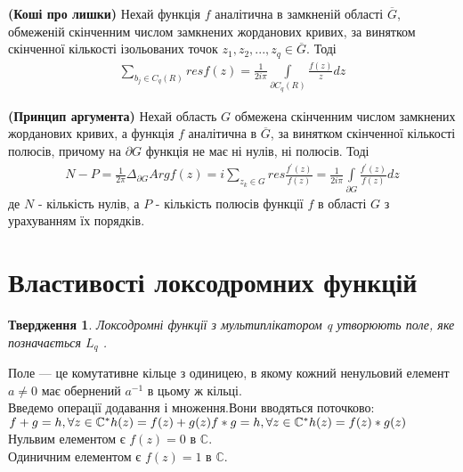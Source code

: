 \documentclass[12pt,a4paper]{article}
\begin{document}
\begin{thmNoNum}
\textbf{(Коші про лишки)}\label{thKoshi}
 Нехай функція $f$ аналітична в замкненій області $\overline{G}$, обмеженій скінченним числом замкнених жорданових кривих, за винятком скінченної кількості ізольованих точок $z_{1}, z_{2},...,z_{q}\in \overline{G}$. Тоді
 \[\begin{array}{l}
\sum \limits_{ b_{j}\in C_{q}(R)} resf(z)= \frac{1}{2i\pi}\int \limits_{\partial C_{q}(R)} \frac{f(z)}{z}dz
\end{array} \]
\end{thmNoNum}
\vspace{1,5cm}

\begin{thmNoNum}
\textbf{(Принцип аргумента)}\label{prArg}
 Нехай область $G$ обмежена скінченним числом замкнених жорданових кривих, а функція $f$ аналітична в $\overline{G}$, за винятком скінченної кількості полюсів, причому на $\partial G$  функція не має ні нулів, ні полюсів. Тоді
\[\begin{array}{l}                    
N-P=\frac{1}{2\pi} \Delta_{\partial G} Arg f(z) =i\sum\limits_{z_k\in G} res \frac{f^{'}(z)}{f(z)} = \frac{1}{2i\pi}\int\limits_{\partial G}^{ }\frac{f^{'}(z)}{f(z)} dz 
\end{array}\]
де $N$ - кількість нулів, а $P$ - кількість полюсів функції $f$ в області $G$ з урахуванням їх порядків.
\end{thmNoNum}
\vspace{1,5cm}
\clearpage
\section{Властивості локсодромних функцій}

\newtheorem{twerd}{Твердження}
\begin{twerd}
 Локсодромні функції з мультиплікатором \textit{q} утворюють поле, яке позначається $L_{q}$ 
 \label{L_{q}}.
 \end{twerd} 
Поле — це комутативне кільце з одиницею, в якому кожний ненульовий елемент $a\neq 0$ має обернений $a^{-1}$ в цьому ж кільці.\\
Введемо операції додавання і множення.Вони вводяться поточково:\\
$f+g=h, \forall z \in \mathbb{C}^{*} h(z)=f(z)+g(z)\\
f*g=h, \forall z \in \mathbb{C}^{*} h(z)=f(z)*g(z)$\\
Нульвим елементом є $f(z)=0$ в $\mathbb{C}$.\\
Одиничним елементом є $f(z)=1$ в $\mathbb{C}$.\\
\end{document}
